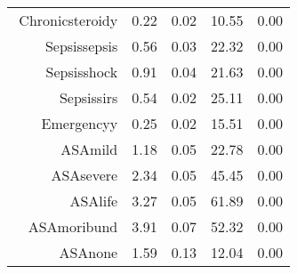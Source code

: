 \begin{tabular}{rrrrr}
$$  Chronic\-steroid\-y & 0.22 & 0.02 & 10.55 & 0.00 \\ 
  Sepsis\-sepsis & 0.56 & 0.03 & 22.32 & 0.00 \\ 
  Sepsis\-shock & 0.91 & 0.04 & 21.63 & 0.00 \\ 
  Sepsis\-sirs & 0.54 & 0.02 & 25.11 & 0.00 \\ 
  Emergency\-y & 0.25 & 0.02 & 15.51 & 0.00 \\ 
  ASA\-mild & 1.18 & 0.05 & 22.78 & 0.00 \\ 
  ASA\-severe & 2.34 & 0.05 & 45.45 & 0.00 \\ 
  ASA\-life & 3.27 & 0.05 & 61.89 & 0.00 \\ 
  ASA\-moribund & 3.91 & 0.07 & 52.32 & 0.00 \\ 
  ASA\-none & 1.59 & 0.13 & 12.04 & 0.00 \\ 
   \hline
\end{tabular}

